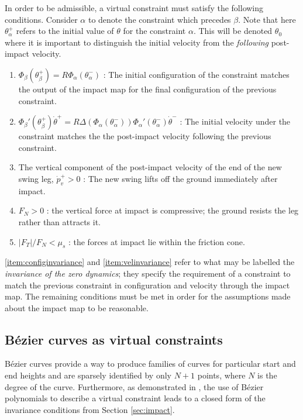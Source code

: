 In order to be admissible, a virtual constraint must satisfy the following conditions. Consider $\alpha$ to denote the constraint which precedes $\beta$. Note that here $\theta_\alpha^+$ refers to the initial value of $\theta$ for the constraint $\alpha$. This will be denoted $\theta_0$ where it is important to distinguish the initial velocity from the \textit{following} post-impact velocity.
\begin{adjustwidth}{1.8cm}{}
\begin{enumerate}[label=\bfseries Condition \arabic*, parsep=0pt]
	\item $\Phi_\beta\left(\theta_\beta^+\right) = R\Phi_\alpha\left(\theta_\alpha^-\right)$ : The initial configuration of the constraint matches the output of the impact map for the final configuration of the previous constraint. \label{item:configinvariance}
	\item $\Phi_\beta'\left(\theta_\beta^+\right)\dot{\theta}^+ = R\Delta\left(\Phi_\alpha(\theta_\alpha^-)\right)\Phi_\alpha'\left(\theta_\alpha^-\right)\dot{\theta}^-$ : The initial velocity under the constraint matches the the post-impact velocity following the previous constraint. \label{item:velinvariance}
	\item The vertical component of the post-impact velocity of the end of the new swing leg, $\dot{p}_v^+ > 0$ : The new swing lifts off the ground immediately after impact. \label{item:liftoff}
	\item $F_N > 0$ : the vertical force at impact is compressive; the ground resists the leg rather than attracts it. \label{item:posnormalF}
	\item $|F_T|/F_N<\mu_s$ : the forces at impact lie within the friction cone. \label{item:frictioncone}
\end{enumerate}
\end{adjustwidth}

\ref{item:configinvariance} and \ref{item:velinvariance} refer to what may be labelled the \textit{invariance of the zero dynamics}; they specify the requirement of a constraint to match the previous constraint in configuration and velocity through the impact map. The remaining conditions must be met in order for the assumptions made about the impact map to be reasonable.

\subsection{B{\'e}zier curves as virtual constraints} \label{sec:bezconstraints}
Bézier curves provide a way to produce families of curves for particular start and end heights and are sparsely identified by only $N+1$ points, where $N$ is the degree of the curve. Furthermore, as demonstrated in \cite{westervelt2007feedback}, the use of Bézier polynomials to describe a virtual constraint leads to a closed form of the invariance conditions from Section \ref{sec:impact}. 

